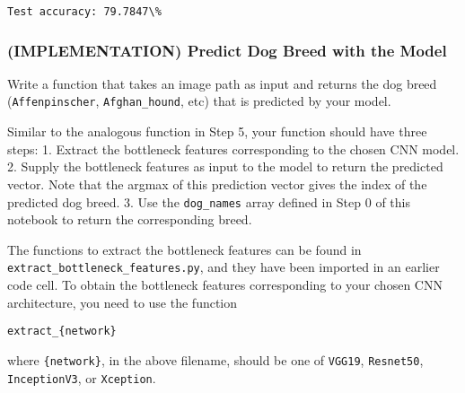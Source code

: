 \documentclass[11pt]{article}
\begin{document}
    \begin{Verbatim}[commandchars=\\\{\}]
Test accuracy: 79.7847\%

    \end{Verbatim}

    \hypertarget{implementation-predict-dog-breed-with-the-model}{%
\subsubsection{(IMPLEMENTATION) Predict Dog Breed with the
Model}\label{implementation-predict-dog-breed-with-the-model}}

Write a function that takes an image path as input and returns the dog
breed (\texttt{Affenpinscher}, \texttt{Afghan\_hound}, etc) that is
predicted by your model.

Similar to the analogous function in Step 5, your function should have
three steps: 1. Extract the bottleneck features corresponding to the
chosen CNN model. 2. Supply the bottleneck features as input to the
model to return the predicted vector. Note that the argmax of this
prediction vector gives the index of the predicted dog breed. 3. Use the
\texttt{dog\_names} array defined in Step 0 of this notebook to return
the corresponding breed.

The functions to extract the bottleneck features can be found in
\texttt{extract\_bottleneck\_features.py}, and they have been imported
in an earlier code cell. To obtain the bottleneck features corresponding
to your chosen CNN architecture, you need to use the function

\begin{verbatim}
extract_{network}
\end{verbatim}

where \texttt{\{network\}}, in the above filename, should be one of
\texttt{VGG19}, \texttt{Resnet50}, \texttt{InceptionV3}, or
\texttt{Xception}.
\end{document}
